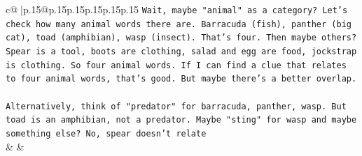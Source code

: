 \documentclass{article}
\begin{document}
{\begin{supertabular}{c@{$\;$}|p{.15\linewidth}@{}p{.15\linewidth}p{.15\linewidth}p{.15\linewidth}p{.15\linewidth}p{.15\linewidth}}
{{{\texttt{Wait, maybe "animal" as a category? Let's check how many animal words there are. Barracuda (fish), panther (big cat), toad (amphibian), wasp (insect). That's four. Then maybe others? Spear is a tool, boots are clothing, salad and egg are food, jockstrap is clothing. So four animal words. If I can find a clue that relates to four animal words, that's good. But maybe there's a better overlap.} \\
\\ 
\texttt{Alternatively, think of "predator" for barracuda, panther, wasp. But toad is an amphibian, not a predator. Maybe "sting" for wasp and maybe something else? No, spear doesn't relate} \\
            }
        }
    }
    & & \\ \\


\end{supertabular}}
\end{document}
